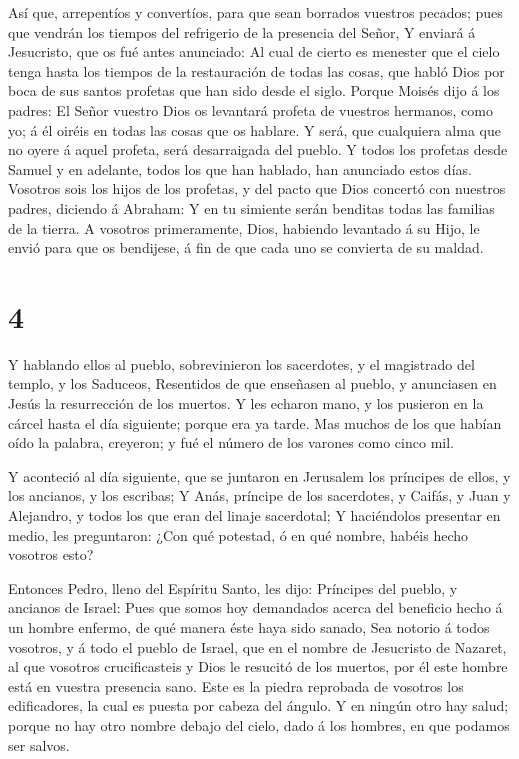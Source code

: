  Así que, arrepentíos y convertíos, para que sean borrados
vuestros pecados; pues que vendrán los tiempos del refrigerio de la
presencia del Señor,  Y enviará á Jesucristo, que os fué
antes anunciado:  Al cual de cierto es menester que el
cielo tenga hasta los tiempos de la restauración de todas las cosas, que
habló Dios por boca de sus santos profetas que han sido desde el siglo.
 Porque Moisés dijo á los padres: El Señor vuestro Dios os
levantará profeta de vuestros hermanos, como yo; á él oiréis en todas
las cosas que os hablare.  Y será, que cualquiera alma que
no oyere á aquel profeta, será desarraigada del pueblo.  Y
todos los profetas desde Samuel y en adelante, todos los que han
hablado, han anunciado estos días.  Vosotros sois los hijos
de los profetas, y del pacto que Dios concertó con nuestros padres,
diciendo á Abraham: Y en tu simiente serán benditas todas las familias
de la tierra.  A vosotros primeramente, Dios, habiendo
levantado á su Hijo, le envió para que os bendijese, á fin de que cada
uno se convierta de su maldad.

\hypertarget{section-3}{%
\section{4}\label{section-3}}

 Y hablando ellos al pueblo, sobrevinieron los sacerdotes, y
el magistrado del templo, y los Saduceos,  Resentidos de que
enseñasen al pueblo, y anunciasen en Jesús la resurrección de los
muertos.  Y les echaron mano, y los pusieron en la cárcel
hasta el día siguiente; porque era ya tarde.  Mas muchos de
los que habían oído la palabra, creyeron; y fué el número de los varones
como cinco mil.

 Y aconteció al día siguiente, que se juntaron en Jerusalem
los príncipes de ellos, y los ancianos, y los escribas;  Y
Anás, príncipe de los sacerdotes, y Caifás, y Juan y Alejandro, y todos
los que eran del linaje sacerdotal;  Y haciéndolos presentar
en medio, les preguntaron: ¿Con qué potestad, ó en qué nombre, habéis
hecho vosotros esto?

 Entonces Pedro, lleno del Espíritu Santo, les dijo:
Príncipes del pueblo, y ancianos de Israel:  Pues que somos
hoy demandados acerca del beneficio hecho á un hombre enfermo, de qué
manera éste haya sido sanado,  Sea notorio á todos
vosotros, y á todo el pueblo de Israel, que en el nombre de Jesucristo
de Nazaret, al que vosotros crucificasteis y Dios le resucitó de los
muertos, por él este hombre está en vuestra presencia sano.
 Este es la piedra reprobada de vosotros los edificadores,
la cual es puesta por cabeza del ángulo.  Y en ningún otro
hay salud; porque no hay otro nombre debajo del cielo, dado á los
hombres, en que podamos ser salvos.

